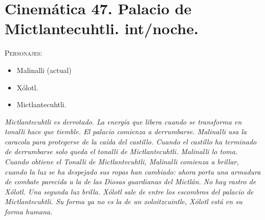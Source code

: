 \section{Cinemática 47. Palacio de Mictlantecuhtli. int/noche.} \label{Cin:Cinematica47}
 \textsc{Personajes}:
 \begin{itemize}
 \item Malinalli (actual)
 \item Xólotl.
 \item Mictlantecuhtli.
 \end{itemize}
\textit{Mictlantecuhtli es derrotado.  La energía que libera cuando se transforma en tonalli hace que tiemble. El palacio comienza a derrumbarse. Malinalli usa la caracola para protegerse de la caída del castillo. Cuando el castillo ha terminado de derrumbarse solo queda el tonalli de Mictlantecuhtli. Malinalli lo toma. Cuando obtiene el Tonalli de Mictlantecuhtli, Malinalli comienza a brillar, cuando la luz se ha despejado sus ropas han cambiado: ahora porta una armadura de combate parecida a la de las Diosas guardianas del Mictlán. No hay rastro de Xólotl. Una segunda luz brilla. Xólotl sale de entre los escombros del palacio de Mictlantecuhtli. Su forma ya no es la de un xoloitzcuintle, Xólotl está en su forma humana. }

